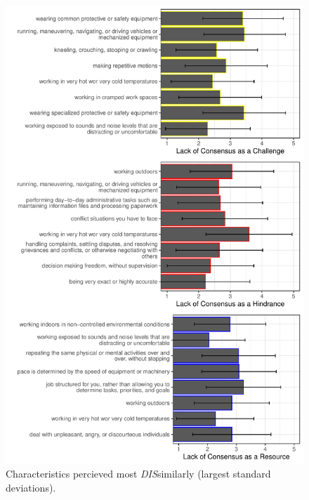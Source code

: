 \documentclass[
  jou,mask]{apa6}
\begin{document}
\begin{figure}
\centering
\includegraphics{Submission_files/figure-latex/combinegraphs2-1.pdf}
\caption{\label{fig:combinegraphs2}Characteristics percieved most \emph{DIS}similarly (largest standard deviations).}
\end{figure}
\end{document}
